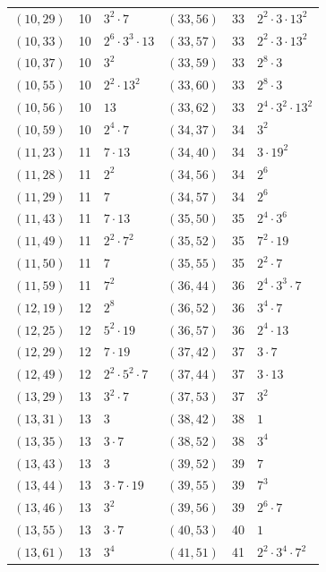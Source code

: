 \documentclass[11pt]{article}
\begin{document}
\begin{longtable}{@{}lrl@{\qquad}lrl@{}}
$(10,29)$ & 10 & $3^{2}\cdot 7$ & $(33,56)$ & 33 & $2^{2}\cdot 3\cdot 13^{2}$\\
$(10,33)$ & 10 & $2^{6}\cdot 3^{3}\cdot 13$ & $(33,57)$ & 33 & $2^{2}\cdot 3\cdot 13^{2}$\\
$(10,37)$ & 10 & $3^{2}$ & $(33,59)$ & 33 & $2^{8}\cdot 3$\\
$(10,55)$ & 10 & $2^{2}\cdot 13^{2}$ & $(33,60)$ & 33 & $2^{8}\cdot 3$\\
$(10,56)$ & 10 & $13$ & $(33,62)$ & 33 & $2^{4}\cdot 3^{2}\cdot 13^{2}$\\
$(10,59)$ & 10 & $2^{4}\cdot 7$ & $(34,37)$ & 34 & $3^{2}$\\
$(11,23)$ & 11 & $7\cdot 13$ & $(34,40)$ & 34 & $3\cdot 19^{2}$\\
$(11,28)$ & 11 & $2^{2}$ & $(34,56)$ & 34 & $2^{6}$\\
$(11,29)$ & 11 & $7$ & $(34,57)$ & 34 & $2^{6}$\\
$(11,43)$ & 11 & $7\cdot 13$ & $(35,50)$ & 35 & $2^{4}\cdot 3^{6}$\\
$(11,49)$ & 11 & $2^{2}\cdot 7^{2}$ & $(35,52)$ & 35 & $7^{2}\cdot 19$\\
$(11,50)$ & 11 & $7$ & $(35,55)$ & 35 & $2^{2}\cdot 7$\\
$(11,59)$ & 11 & $7^{2}$ & $(36,44)$ & 36 & $2^{4}\cdot 3^{3}\cdot 7$\\
$(12,19)$ & 12 & $2^{8}$ & $(36,52)$ & 36 & $3^{4}\cdot 7$\\
$(12,25)$ & 12 & $5^{2}\cdot 19$ & $(36,57)$ & 36 & $2^{4}\cdot 13$\\
$(12,29)$ & 12 & $7\cdot 19$ & $(37,42)$ & 37 & $3\cdot 7$\\
$(12,49)$ & 12 & $2^{2}\cdot 5^{2}\cdot 7$ & $(37,44)$ & 37 & $3\cdot 13$\\
$(13,29)$ & 13 & $3^{2}\cdot 7$ & $(37,53)$ & 37 & $3^{2}$\\
$(13,31)$ & 13 & $3$ & $(38,42)$ & 38 & $1$\\
$(13,35)$ & 13 & $3\cdot 7$ & $(38,52)$ & 38 & $3^{4}$\\
$(13,43)$ & 13 & $3$ & $(39,52)$ & 39 & $7$\\
$(13,44)$ & 13 & $3\cdot 7\cdot 19$ & $(39,55)$ & 39 & $7^{3}$\\
$(13,46)$ & 13 & $3^{2}$ & $(39,56)$ & 39 & $2^{6}\cdot 7$\\
$(13,55)$ & 13 & $3\cdot 7$ & $(40,53)$ & 40 & $1$\\
$(13,61)$ & 13 & $3^{4}$ & $(41,51)$ & 41 & $2^{2}\cdot 3^{4}\cdot 7^{2}$\\

\end{longtable}
\end{document}
